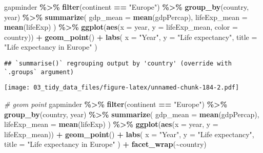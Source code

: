 \documentclass[
]{book}
\newenvironment{Shaded}{\begin{snugshade}}{\end{snugshade}}
\newcommand{\CommentTok}[1]{\textcolor[rgb]{0.56,0.35,0.01}{\textit{#1}}}
\newcommand{\DataTypeTok}[1]{\textcolor[rgb]{0.13,0.29,0.53}{#1}}
\newcommand{\KeywordTok}[1]{\textcolor[rgb]{0.13,0.29,0.53}{\textbf{#1}}}
\newcommand{\NormalTok}[1]{#1}
\newcommand{\OperatorTok}[1]{\textcolor[rgb]{0.81,0.36,0.00}{\textbf{#1}}}
\newcommand{\StringTok}[1]{\textcolor[rgb]{0.31,0.60,0.02}{#1}}
\begin{document}
\begin{Shaded}
\begin{Highlighting}[]
\NormalTok{gapminder }\OperatorTok{\%\textgreater{}\%}
\StringTok{  }\KeywordTok{filter}\NormalTok{(continent }\OperatorTok{==}\StringTok{ "Europe"}\NormalTok{) }\OperatorTok{\%\textgreater{}\%}
\StringTok{  }\KeywordTok{group\_by}\NormalTok{(country, year) }\OperatorTok{\%\textgreater{}\%}
\StringTok{  }\KeywordTok{summarize}\NormalTok{(}
    \DataTypeTok{gdp\_mean =} \KeywordTok{mean}\NormalTok{(gdpPercap),}
    \DataTypeTok{lifeExp\_mean =} \KeywordTok{mean}\NormalTok{(lifeExp)}
\NormalTok{  ) }\OperatorTok{\%\textgreater{}\%}
\StringTok{  }\KeywordTok{ggplot}\NormalTok{(}\KeywordTok{aes}\NormalTok{(}\DataTypeTok{x =}\NormalTok{ year, }\DataTypeTok{y =}\NormalTok{ lifeExp\_mean, }\DataTypeTok{color =}\NormalTok{ country)) }\OperatorTok{+}
\StringTok{  }\KeywordTok{geom\_point}\NormalTok{() }\OperatorTok{+}
\StringTok{  }\KeywordTok{labs}\NormalTok{(}
    \DataTypeTok{x =} \StringTok{"Year"}\NormalTok{,}
    \DataTypeTok{y =} \StringTok{"Life expectancy"}\NormalTok{,}
    \DataTypeTok{title =} \StringTok{"Life expectancy in Europe"}
\NormalTok{  )}
\end{Highlighting}
\end{Shaded}

\begin{verbatim}
## `summarise()` regrouping output by 'country' (override with `.groups` argument)
\end{verbatim}

\texttt{[image: 03\_tidy\_data\_files/figure-latex/unnamed-chunk-184-2.pdf]}

\begin{Shaded}
\begin{Highlighting}[]
\CommentTok{\# geom point}
\NormalTok{gapminder }\OperatorTok{\%\textgreater{}\%}
\StringTok{  }\KeywordTok{filter}\NormalTok{(continent }\OperatorTok{==}\StringTok{ "Europe"}\NormalTok{) }\OperatorTok{\%\textgreater{}\%}
\StringTok{  }\KeywordTok{group\_by}\NormalTok{(country, year) }\OperatorTok{\%\textgreater{}\%}
\StringTok{  }\KeywordTok{summarize}\NormalTok{(}
    \DataTypeTok{gdp\_mean =} \KeywordTok{mean}\NormalTok{(gdpPercap),}
    \DataTypeTok{lifeExp\_mean =} \KeywordTok{mean}\NormalTok{(lifeExp)}
\NormalTok{  ) }\OperatorTok{\%\textgreater{}\%}
\StringTok{  }\KeywordTok{ggplot}\NormalTok{(}\KeywordTok{aes}\NormalTok{(}\DataTypeTok{x =}\NormalTok{ year, }\DataTypeTok{y =}\NormalTok{ lifeExp\_mean)) }\OperatorTok{+}
\StringTok{  }\KeywordTok{geom\_point}\NormalTok{() }\OperatorTok{+}
\StringTok{  }\KeywordTok{labs}\NormalTok{(}
    \DataTypeTok{x =} \StringTok{"Year"}\NormalTok{,}
    \DataTypeTok{y =} \StringTok{"Life expectancy"}\NormalTok{,}
    \DataTypeTok{title =} \StringTok{"Life expectancy in Europe"}
\NormalTok{  ) }\OperatorTok{+}
\StringTok{  }\KeywordTok{facet\_wrap}\NormalTok{(}\OperatorTok{\textasciitilde{}}\NormalTok{country)}
\end{Highlighting}
\end{Shaded}
\end{document}
